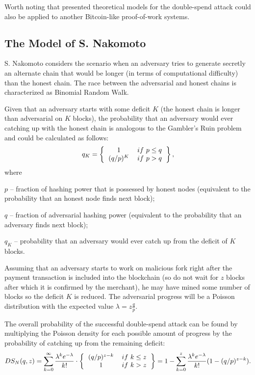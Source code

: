 \documentclass[10pt,a4paper]{article}
\numberwithin{equation}{section} %
\theoremstyle{plain}
\theoremstyle{definition}
\theoremstyle{remark}
\begin{document}
	Worth noting that presented theoretical models for the double-spend attack could also be applied to another Bitcoin-like proof-of-work systems.
	
	\subsection{The Model of S. Nakomoto} \label{sec:nakomoto}
	
	S. Nakomoto considers the scenario when an adversary tries to generate secretly an alternate chain that would be longer (in terms of computational difficulty) than the honest chain. The race between the adversarial and honest chains is characterized as Binomial Random Walk.
	
	Given that an adversary starts with some deficit \(K\) (the honest chain is longer than adversarial on \(K\) blocks), the probability that an adversary would ever catching up with the honest chain is analogous to the Gambler's Ruin problem and could be calculated as follows:
	\[ q_K = 
	    \left \{
            \begin{tabular}{cc}
                1       & \(if\  p \leq q\) \\
                \((q/p)^K\) & \(if\  p > q\) \\
            \end{tabular}
        \right \},
	\]
	where
	
	\(p\) -- fraction of hashing power that is possessed by honest nodes (equivalent to the probability that an honest node finds next block);
	
	\(q\) -- fraction of adversarial hashing power (equivalent to the probability that an adversary finds next block);
	
	\(q_K\) -- probability that an adversary would ever catch up from the deficit of \(K\) blocks.
	
	Assuming that an adversary starts to work on malicious fork right after the payment transaction is included into the blockchain (so do not wait for \(z\) blocks after which it is confirmed by the merchant), he may have mined some number of blocks so the deficit \(K\) is reduced. The adversarial progress will be a Poisson distribution with the expected value \( \lambda = z\frac{q}{p} \).
	
	The overall probability of the successful double-spend attack can be found by multiplying the Poisson density for each possible amount of progress by the probability of catching up from the remaining deficit:
	\begin{equation} \label{eq:nak_DS}
	    DS_N(q,z) =
	    \sum_{k=0}^{\infty} \frac{\lambda^k e^{-\lambda}}{k!} \cdot
	    \left \{
            \begin{tabular}{cc}
                \((q/p)^{z-k}\) & \(if\  k \leq z\) \\
                1       & \(if\  k > z\) \\
            \end{tabular}
        \right \}
        =
        1 - \sum_{k=0}^{z} \frac{\lambda^k e^{-\lambda}}{k!}(1 - (q/p)^{z-k}).
	\end{equation}
	
\end{document}
